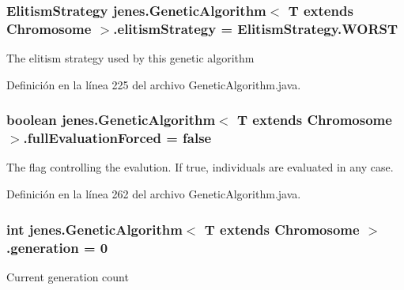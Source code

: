 \hypertarget{classjenes_1_1_genetic_algorithm_3_01_t_01extends_01_chromosome_01_4_aacba3e1823ba66a2dd6d3c902f8ff719}{
\subsubsection[{elitism\-Strategy}]{\setlength{\rightskip}{0pt plus 5cm}Elitism\-Strategy jenes.\-Genetic\-Algorithm$<$ T extends Chromosome $>$.elitism\-Strategy = Elitism\-Strategy.\-W\-O\-R\-S\-T\hspace{0.3cm}{\ttfamily [protected]}}}\label{classjenes_1_1_genetic_algorithm_3_01_t_01extends_01_chromosome_01_4_aacba3e1823ba66a2dd6d3c902f8ff719}
The elitism strategy used by this genetic algorithm 

Definición en la línea 225 del archivo Genetic\-Algorithm.\-java.

\hypertarget{classjenes_1_1_genetic_algorithm_3_01_t_01extends_01_chromosome_01_4_adb627d0c6d6744f53ef5c3b7506913e9}{
\subsubsection[{full\-Evaluation\-Forced}]{\setlength{\rightskip}{0pt plus 5cm}boolean jenes.\-Genetic\-Algorithm$<$ T extends Chromosome $>$.full\-Evaluation\-Forced = false\hspace{0.3cm}{\ttfamily [protected]}}}\label{classjenes_1_1_genetic_algorithm_3_01_t_01extends_01_chromosome_01_4_adb627d0c6d6744f53ef5c3b7506913e9}
The flag controlling the evalution. If true, individuals are evaluated in any case. 

Definición en la línea 262 del archivo Genetic\-Algorithm.\-java.

\hypertarget{classjenes_1_1_genetic_algorithm_3_01_t_01extends_01_chromosome_01_4_ac5a1ddc5e78e2b81c754eb990a91f17b}{
\subsubsection[{generation}]{\setlength{\rightskip}{0pt plus 5cm}int jenes.\-Genetic\-Algorithm$<$ T extends Chromosome $>$.generation = 0\hspace{0.3cm}{\ttfamily [protected]}}}\label{classjenes_1_1_genetic_algorithm_3_01_t_01extends_01_chromosome_01_4_ac5a1ddc5e78e2b81c754eb990a91f17b}
Current generation count 


